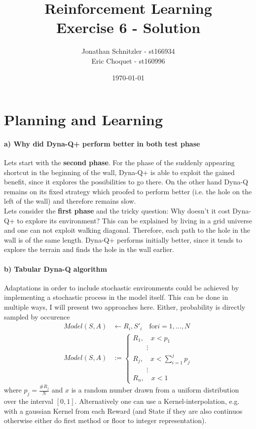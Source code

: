 \documentclass{article}
\title{Reinforcement Learning \\ Exercise 6 - Solution}
\author{Jonathan Schnitzler - st166934 \\
Eric Choquet - st160996}
\date{\today}
\begin{document}
\maketitle

\section{Planning and Learning}

\paragraph*{a) Why did Dyna-Q+ perform better in both test phase}

Lets start with the \textbf{second phase}. For the phase of the suddenly appearing shortcut in the beginning of the wall, Dyna-Q+ is able to exploit the gained benefit, since it explores the possibilities to go there. On the other hand Dyna-Q remains on its fixed strategy which proofed to perform better (i.e. the hole on the left of the wall) and therefore remains slow. \\

Lets consider the \textbf{first phase} and the tricky question: Why doesn't it cost Dyna-Q+ to explore its environment? This can be explained by living in a grid universe and one can not exploit walking diagonal. Therefore, each path to the hole in the wall is of the same length. Dyna-Q+ performs initially better, since it tends to explore the terrain and finds the hole in the wall earlier.


\paragraph*{b) Tabular Dyna-Q algorithm}

Adaptations in order to include stochastic environments could be achieved by implementing a stochastic process in the model itself. This can be done in multiple ways, I will present two approaches here. Either, probability is directly sampled by occurence
\begin{align}
    Model(S,A) &\leftarrow R_i, S'_i \quad \text{for} i = 1,...,N \\
    Model(S, A) &:= \begin{cases} R_1, \quad x < p_1 \\
                                  \qquad \vdots \\
                                  R_j, \quad x < \sum_{i=1}^j p_j \\
                                  \qquad \vdots \\
                                  R_n, \quad x < 1
                    \end{cases}
\end{align}
where $p_j = \frac{\# R_j}{N}$ and $x$ is a random number drawn from a uniform distribution over the interval $[0, 1]$. Alternatively one can use a Kernel-interpolation, e.g. with a gaussian Kernel from each Reward (and State if they are also continuos otherwise either do first method or floor to integer representation). 
\end{document}
